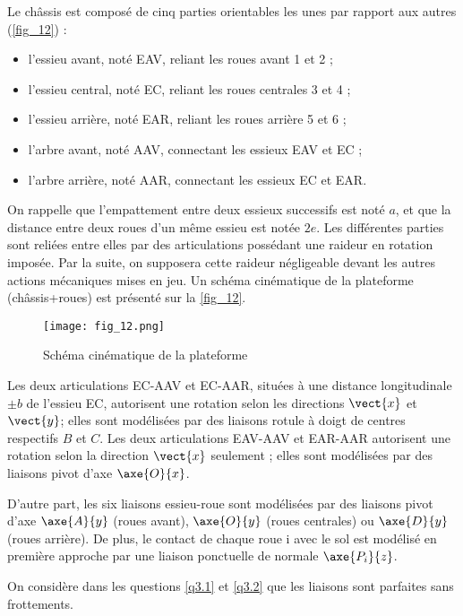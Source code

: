Le châssis est composé de cinq parties orientables les unes par rapport aux autres (\autoref{fig_12}) :
\begin{itemize}
\item l'essieu avant, noté EAV, reliant les roues avant 1 et 2 ;
\item l'essieu central, noté EC, reliant les roues centrales 3 et 4 ;
\item l'essieu arrière, noté EAR, reliant les roues arrière 5 et 6 ;
\item l'arbre avant, noté AAV, connectant les essieux EAV et EC ;
\item l'arbre arrière, noté AAR, connectant les essieux EC et EAR.
\end{itemize}
On rappelle que l'empattement entre deux essieux successifs est noté $a$, et que la distance entre
deux roues d'un même essieu est notée $2e$.
Les différentes parties sont reliées entre elles par des articulations possédant une raideur en
rotation imposée. Par la suite, on supposera cette raideur négligeable devant les autres actions
mécaniques mises en jeu.
Un schéma cinématique de la plateforme (châssis+roues) est présenté sur la \autoref{fig_12}.

\begin{figure}[H]
\centering
\texttt{[image: fig\_12.png]}
\caption{Schéma cinématique de la plateforme\label{fig_12}}
\end{figure}

Les deux articulations EC-AAV et EC-AAR, situées à une distance longitudinale $\pm b$ de l'essieu
EC, autorisent une rotation selon les directions $\vect{x}$ et $\vect{y}$; elles sont modélisées par des liaisons
rotule à doigt de centres respectifs $B$ et $C$. Les deux articulations EAV-AAV et EAR-AAR
autorisent une rotation selon la direction $\vect{x}$ seulement ; elles sont modélisées par des liaisons
pivot d'axe $\axe{O}{x}$.

D'autre part, les six liaisons essieu-roue sont modélisées par des liaisons pivot d'axe $\axe{A}{y}$
(roues avant), $\axe{O}{y}$ (roues centrales) ou $\axe{D}{y}$ (roues arrière). De plus, le contact de chaque
roue i avec le sol est modélisé en première approche par une liaison ponctuelle de normale
$\axe{P_i}{z}$.

On considère dans les questions \ref{q3.1} et \ref{q3.2} que les liaisons sont parfaites sans frottements.








